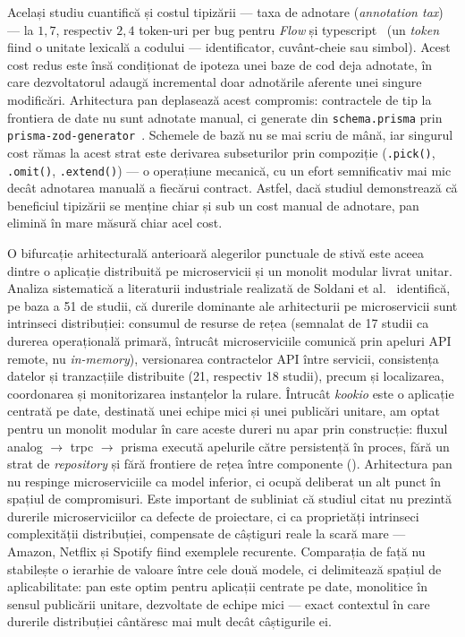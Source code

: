 Același studiu cuantifică și costul tipizării --- taxa de adnotare (\textit{annotation tax}) --- la \(1{,}7\), respectiv \(2{,}4\) token-uri per bug pentru \textit{Flow} și \gls{typescript}~\cite{gao2017type} (un \textit{token} fiind o unitate lexicală a codului --- identificator, cuvânt-cheie sau simbol). Acest cost redus este însă condiționat de ipoteza unei baze de cod deja adnotate, în care dezvoltatorul adaugă incremental doar adnotările aferente unei singure modificări. Arhitectura \gls{pan} deplasează acest compromis: contractele de tip la frontiera de date nu sunt adnotate manual, ci generate din \texttt{schema.prisma} prin \texttt{prisma-zod-generator}~\cite{prisma_zod_generator}. Schemele de bază nu se mai scriu de mână, iar singurul cost rămas la acest strat este derivarea subseturilor prin compoziție (\texttt{.pick()}, \texttt{.omit()}, \texttt{.extend()}) --- o operațiune mecanică, cu un efort semnificativ mai mic decât adnotarea manuală a fiecărui contract. Astfel, dacă studiul demonstrează că beneficiul tipizării se menține chiar și sub un cost manual de adnotare, \gls{pan} elimină în mare măsură chiar acel cost.

O bifurcație arhitecturală anterioară alegerilor punctuale de stivă este aceea dintre o aplicație distribuită pe microservicii și un monolit modular livrat unitar. Analiza sistematică a literaturii industriale realizată de Soldani et al.~\cite{soldani2018} identifică, pe baza a 51 de studii, că durerile dominante ale arhitecturii pe microservicii sunt intrinseci distribuției: consumul de resurse de rețea (semnalat de 17 studii ca durerea operațională primară, întrucât microserviciile comunică prin apeluri API remote, nu \textit{in-memory}), versionarea contractelor API între servicii, consistența datelor și tranzacțiile distribuite (21, respectiv 18 studii), precum și localizarea, coordonarea și monitorizarea instanțelor la rulare. Întrucât \textit{\gls{kookio}} este o aplicație centrată pe date, destinată unei echipe mici și unei publicări unitare, am optat pentru un monolit modular în care aceste dureri nu apar prin construcție: fluxul \gls{analog} \(\rightarrow\) \gls{trpc} \(\rightarrow\) \gls{prisma} execută apelurile către persistență în proces, fără un strat de \textit{repository} și fără frontiere de rețea între componente (). Arhitectura \gls{pan} nu respinge microserviciile ca model inferior, ci ocupă deliberat un alt punct în spațiul de compromisuri.
Este important de subliniat că studiul citat nu prezintă durerile microserviciilor ca defecte de proiectare, ci ca proprietăți intrinseci complexității distribuției, compensate de câștiguri reale la scară mare --- Amazon, Netflix și Spotify fiind exemplele recurente. Comparația de față nu stabilește o ierarhie de valoare între cele două modele, ci delimitează spațiul de aplicabilitate: \gls{pan} este optim pentru aplicații centrate pe date, monolitice în sensul publicării unitare, dezvoltate de echipe mici --- exact contextul în care durerile distribuției cântăresc mai mult decât câștigurile ei.

